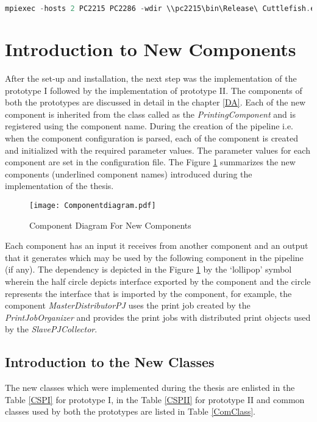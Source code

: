 \begin{lstlisting}[language=C++,label={lst:MPIC},caption={mpiexec syntax}]
mpiexec -hosts 2 PC2215 PC2286 -wdir \\pc2215\bin\Release\ Cuttlefish.exe \\pc2215\mainconf.json
\end{lstlisting}  
	
\section{Introduction to New Components}

After the set-up and installation, the next step was the implementation of the prototype I followed by the implementation of prototype II. The components of both the prototypes are discussed in detail in the chapter \ref{DA}. Each of the new component is inherited from the class called as the \textit{PrintingComponent} and is registered using the component name. During the creation of the pipeline i.e. when the component configuration is parsed, each of the component is created and initialized with the required parameter values. The parameter values for each component are set in the configuration file. The Figure \ref{fig:Componentdiagram} summarizes the new components (underlined component names) introduced during the implementation of the thesis.

\begin{figure}[ht!]
\centering
\texttt{[image: Componentdiagram.pdf]}
\caption{Component Diagram For New Components}
\label{fig:Componentdiagram}
\end{figure}

Each component has an input it receives from another component and an output that it generates which may be used by the following component in the pipeline (if any). The dependency is depicted in the Figure \ref{fig:Componentdiagram} by the {\lq}lollipop{\rq} symbol wherein the half circle depicts interface exported by the component and the circle represents the interface that is imported by the component, for example, the component \textit{MasterDistributorPJ} uses the print job created by the \textit{PrintJobOrganizer} and provides the print jobs with distributed print objects used by the \textit{SlavePJCollector}.

\subsection{Introduction to the New Classes}
The new classes which were implemented during the thesis are enlisted in the Table \ref{CSPI} for prototype I, in the Table \ref{CSPII} for prototype II and common classes used by both the prototypes are listed in Table \ref{ComClass}. 

